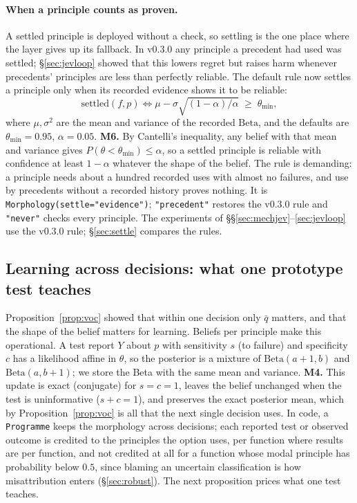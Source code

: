 \documentclass[11pt]{article}
\theoremstyle{definition}
\begin{document}
\paragraph{When a principle counts as proven.} A settled principle is deployed without a check, so
settling is the one place where the layer gives up its fallback. In v0.3.0 any principle a precedent
had used was settled; \S\ref{sec:jevloop} showed that this lowers regret but raises harm whenever
precedents' principles are less than perfectly reliable. The default rule now settles a principle only
when its recorded evidence shows it to be reliable:
\begin{equation}\label{eq:settle}
\text{settled}(f,p)\iff\mu-\sigma\sqrt{(1-\alpha)/\alpha}\;\ge\;\theta_{\min},
\end{equation}
where $\mu,\sigma^2$ are the mean and variance of the recorded $\mathrm{Beta}$, and the defaults are
$\theta_{\min}=0.95$, $\alpha=0.05$. \textbf{M6.} By Cantelli's inequality, any belief with that mean and
variance gives $P(\theta<\theta_{\min})\le\alpha$, so a settled principle is reliable with confidence at
least $1-\alpha$ whatever the shape of the belief. The rule is demanding: a principle needs about a
hundred recorded uses with almost no failures, and use by precedents without a recorded history
proves nothing. It is \texttt{Morphology(settle="evidence")}; \texttt{"precedent"} restores the
v0.3.0 rule and \texttt{"never"} checks every principle. The experiments of
\S\S\ref{sec:mechjev}--\ref{sec:jevloop} use the v0.3.0 rule; \S\ref{sec:settle} compares the rules.

\subsection{Learning across decisions: what one prototype test teaches}\label{sec:learning}

Proposition~\ref{prop:voc} showed that within one decision only $\bar q$ matters, and that the
shape of the belief matters for learning. Beliefs per principle make this operational. A test
report $Y$ about $p$ with sensitivity $s$ (to failure) and specificity $c$ has a likelihood affine in
$\theta$, so the posterior is a mixture of $\mathrm{Beta}(a+1,b)$ and $\mathrm{Beta}(a,b+1)$; we store
the Beta with the same mean and variance. \textbf{M4.} This update is exact (conjugate) for
$s=c=1$, leaves the belief unchanged when the test is uninformative ($s+c=1$), and preserves the
exact posterior mean, which by Proposition~\ref{prop:voc} is all that the next single decision
uses. In code, a \texttt{Programme} keeps the morphology across decisions; each reported test or
observed outcome is credited to the principles the option uses, per function where results are per
function, and not credited at all for a function whose modal principle has probability below $0.5$,
since blaming an uncertain classification is how misattribution enters (\S\ref{sec:robust}). The
next proposition prices what one test teaches.
\end{document}
